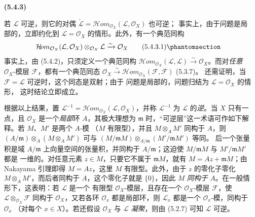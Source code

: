 \documentclass[UTF8,fontset=none,11pt,oneside,openany]{ctexbook}
\newenvironment{env}[1][]{%
  \par\medskip\noindent\textbf{(#1)}\ %
}{\par}
\let\EGAOriginalLabel\label
\renewcommand{\label}[1]{\phantomsection\EGAOriginalLabel{#1}}
\begin{document}
\begin{env}[5.4.3]
\label{0.5.4.3-fr}
若 $\mathcal{L}$ 可逆，则它的对偶
$\check{\mathcal{L}}=
\mathcal{H}\!om_{\mathcal{O}_X}(\mathcal{L},\mathcal{O}_X)$ 也可逆；
事实上，由于问题是局部的，立即约化到 $\mathcal{L}=\mathcal{O}_X$
的情形。此外，有一个典范同构
\[
  \mathcal{H}\!om_{\mathcal{O}_X}(\mathcal{L},\mathcal{O}_X)
  \otimes_{\mathcal{O}_X}\mathcal{L}
  \xrightarrow{\sim}
  \mathcal{O}_X
  \tag{5.4.3.1}\label{0.5.4.3.1-fr}
\]
事实上，由 (5.4.2)，只须定义一个典范同构
$\mathcal{H}\!om_{\mathcal{O}_X}(\mathcal{L},\mathcal{L})
\xrightarrow{\sim}\mathcal{O}_X$。而对\emph{任意}
$\mathcal{O}_X$-模层 $\mathcal{F}$，都有一个典范同态
$\mathcal{O}_X\xrightarrow{\sim}
\mathcal{H}\!om_{\mathcal{O}_X}(\mathcal{F},\mathcal{F})$ (5.3.7)。
还需证明，当 $\mathcal{F}=\mathcal{L}$ 可逆时，这个同态是双射；由于
问题是局部的，问题归结为 $\mathcal{L}=\mathcal{O}_X$ 的情形，
这时结论立即成立。

根据以上结果，置
$\mathcal{L}^{-1}=
\mathcal{H}\!om_{\mathcal{O}_X}(\mathcal{L},\mathcal{O}_X)$，并称
$\mathcal{L}^{-1}$ 为 $\mathcal{L}$ 的\emph{逆}。当 $X$ 只有一点，且
$\mathcal{O}_X$ 是一个\emph{局部}环 $A$，其极大理想为 $\mathfrak m$
时，“可逆层”这一术语可作如下解释。若 $M$、$M'$ 是两个 $A$-模
（$M$ 有限型），并且 $M\otimes_A M'$ 同构于 $A$，则
$(A/\mathfrak m)\otimes_A(M\otimes_A M')$ 可与
$(M/\mathfrak mM)\otimes_{A/\mathfrak m}(M'/\mathfrak mM')$ 等同。
后一个张量积是域 $A/\mathfrak m$ 上向量空间的张量积，并同构于
$A/\mathfrak m$；这迫使 $M/\mathfrak mM$ 与 $M'/\mathfrak mM'$ 都是
一维的。对任意元素 $z\in M$，只要它不属于 $\mathfrak mM$，就有
$M=Az+\mathfrak mM$；由 Nakayama 引理即得 $M=Az$，这里 $M$
有限型。此外，由于 $z$ 的零化子零化
$M\otimes_A M'$，而后者同构于 $A$，这个零化子就是 $\{0\}$，因此
$M$ \emph{同构于 $A$}。在一般情形下，这表明：若 $\mathcal{L}$ 是一个
有限型 $\mathcal{O}_X$-模层，且存在一个 $\mathcal{O}_X$-模层
$\mathcal{F}$，使 $\mathcal{L}\otimes_{\mathcal{O}_X}\mathcal{F}$
同构于 $\mathcal{O}_X$，又若各环 $\mathcal{O}_x$ 都是局部环，则
$\mathcal{L}_x$ 都是一个 $\mathcal{O}_x$-模，同构于 $\mathcal{O}_x$
（对每个 $x\in X$）。若还假设 $\mathcal{O}_X$ 与 $\mathcal{L}$
\emph{凝聚}，则由 (5.2.7) 可知 $\mathcal{L}$ 可逆。
\end{env}
\end{document}
